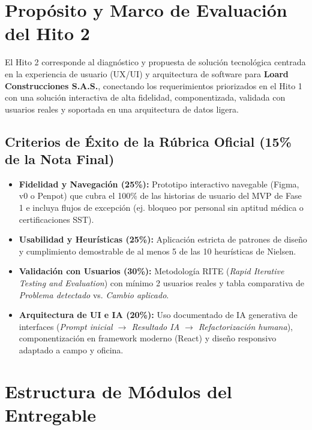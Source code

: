 \documentclass[11pt,letterpaper]{article}
\begin{document}
\section{Propósito y Marco de Evaluación del Hito 2}

El Hito 2 corresponde al diagnóstico y propuesta de solución tecnológica centrada en la experiencia de usuario (UX/UI) y arquitectura de software para \textbf{Loard Construcciones S.A.S.}, conectando los requerimientos priorizados en el Hito 1 con una solución interactiva de alta fidelidad, componentizada, validada con usuarios reales y soportada en una arquitectura de datos ligera.

\subsection{Criterios de Éxito de la Rúbrica Oficial (15\% de la Nota Final)}
\begin{itemize}
    \item \textbf{Fidelidad y Navegación (25\%):} Prototipo interactivo navegable (Figma, v0 o Penpot) que cubra el 100\% de las historias de usuario del MVP de Fase 1 e incluya flujos de excepción (ej. bloqueo por personal sin aptitud médica o certificaciones SST).
    \item \textbf{Usabilidad y Heurísticas (25\%):} Aplicación estricta de patrones de diseño y cumplimiento demostrable de al menos 5 de las 10 heurísticas de Nielsen.
    \item \textbf{Validación con Usuarios (30\%):} Metodología RITE (\emph{Rapid Iterative Testing and Evaluation}) con mínimo 2 usuarios reales y tabla comparativa de \emph{Problema detectado} vs. \emph{Cambio aplicado}.
    \item \textbf{Arquitectura de UI e IA (20\%):} Uso documentado de IA generativa de interfaces (\emph{Prompt inicial $\rightarrow$ Resultado IA $\rightarrow$ Refactorización humana}), componentización en framework moderno (React) y diseño responsivo adaptado a campo y oficina.
\end{itemize}

\section{Estructura de Módulos del Entregable}
\end{document}
